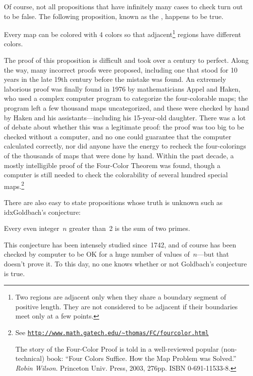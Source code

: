\begin{editingnoes}
Of course, not all propositions that have infinitely many cases to
check turn out to be false.  The following proposition, known as the
, happens to be true.
\begin{proposition}\label{4colorprop}
Every map can be colored with 4 colors so that adjacent\footnote{Two
  regions are adjacent only when they share a boundary segment of
  positive length.  They are not considered to be adjacent if their
  boundaries meet only at a few points.} regions have different
colors.
\end{proposition}
The proof of this proposition is difficult and took over a century to
perfect.  Along the way, many incorrect proofs were proposed,
including one that stood for 10 years in the late 19th century before
the mistake was found.  An extremely laborious proof was finally found
in 1976 by mathematicians Appel and Haken, who used a complex computer
program to categorize the four-colorable maps; the program left a few
thousand maps uncategorized, and these were checked by hand by Haken
and his assistants---including his 15-year-old daughter.  There was a
lot of debate about whether this was a legitimate proof: the proof was
too big to be checked without a computer, and no one could guarantee
that the computer calculated correctly, nor did anyone have the energy
to recheck the four-colorings of the thousands of maps that were done by
hand.  Within the past decade, a mostly intelligible proof of the
Four-Color Theorem was found, though a computer is still needed to
check the colorability of several hundred special maps.\footnote{See
\href{http://www.math.gatech.edu/~thomas/FC/fourcolor.html}
{\texttt{http://www.math.gatech.edu/\~{}thomas/FC/fourcolor.html}}

The story of the Four-Color Proof is told in a well-reviewed
  popular (non-technical) book: ``Four Colors Suffice.  How the Map
  Problem was Solved.'' \emph{Robin Wilson}.  Princeton Univ. Press, 2003,
  276pp. ISBN 0-691-11533-8.}

There are also easy to state propositions whose truth is unknown such
as idx{Goldbach's conjecture}:
\begin{proposition}[Goldbach]
Every even integer~$n$ greater than~2 is the sum of two primes.
\end{proposition}
This conjecture has been intensely studied since~1742, and of course
has been checked by computer to be OK for a huge number of values
of~$n$---but that doesn't prove it.  To this day, no one knows whether
or not Goldbach's conjecture is true.


\end{editingnoes}

